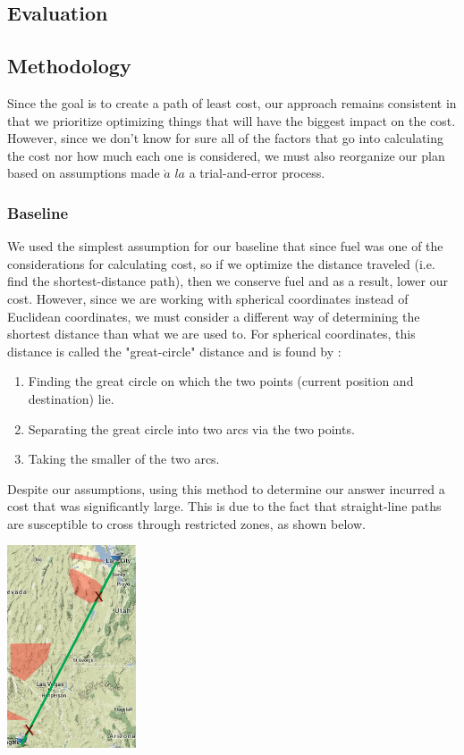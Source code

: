 \documentclass{article}[12pt]
\begin{document}
\begin{multicols}{2}
\section{Evaluation}
\subsection{Methodology}
Since the goal is to create a path of least cost, our approach remains consistent in that we prioritize optimizing things that will have the biggest impact on the cost. However, since we don't know for sure all of the factors that go into calculating the cost nor how much each one is considered, we must also reorganize our plan based on assumptions made $\grave{a}$ $la$ a trial-and-error process.

\subsubsection{Baseline}

We used the simplest assumption for our baseline that since fuel was one of the considerations for calculating cost, so if we optimize the distance traveled (i.e. find the shortest-distance path), then we conserve fuel and as a result, lower our cost. However, since we are working with spherical coordinates instead of Euclidean coordinates, we must consider a different way of determining the shortest distance than what we are used to. For spherical coordinates, this distance is called the "great-circle" distance and is found by \cite{wiki}:\\

	\begin{enumerate}
		\item Finding the great circle on which the two points (current position and destination) lie.
		\item Separating the great circle into two arcs via the two points. 
		\item Taking the smaller of the two arcs.\\
	\end{enumerate}

Despite our assumptions, using this method to determine our answer incurred a cost that was significantly large. This is due to the fact that straight-line paths are susceptible to cross through restricted zones, as shown below.

\begingroup
  \begin{center}
    \includegraphics[width=1.5in]{baseline.png}
	\end{center}
\endgroup


\end{multicols}
\end{document}
